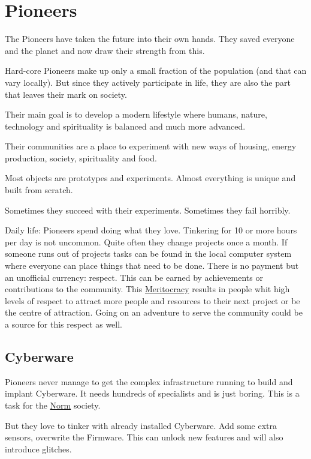 \section{Pioneers}
\label{sec:Pioneers}

The Pioneers have taken the future into their own hands. They saved everyone and the planet and now draw their strength from this.

Hard-core Pioneers make up only a small fraction of the population (and that can vary locally). But since they actively participate in life, they are also the part that leaves their mark on society.

Their main goal is to develop a modern lifestyle where humans, nature, technology and spirituality is balanced and much more advanced.

Their communities are a place to experiment with new ways of housing, energy production, society, spirituality and food.

Most objects are prototypes and experiments. Almost everything is unique and built from scratch.

Sometimes they succeed with their experiments. Sometimes they fail horribly.


Daily life: Pioneers spend doing what they love. Tinkering for 10 or more hours per day is not uncommon. Quite often they change projects once a month. If someone runs out of projects tasks can be found in the local computer system where everyone can place things that need to be done. There is no payment but an unofficial currency: respect. This can be earned by achievements or contributions to the community. This \hyperref[sec:meritocracy]{Meritocracy} results in people whit high levels of respect to attract more people and resources to their next project or be the centre of attraction.
Going on an adventure to serve the community could be a source for this respect as well.

\subsection{Cyberware}
\label{sec:Cyberware Pioneers}

Pioneers never manage to get the complex infrastructure running to build and implant Cyberware. It needs hundreds of specialists and is just boring. This is a task for the \hyperref[sec:Cyberware Norm]{Norm} society.

But they love to tinker with already installed Cyberware. Add some extra sensors, overwrite the Firmware. This can unlock new features and will also introduce glitches.


